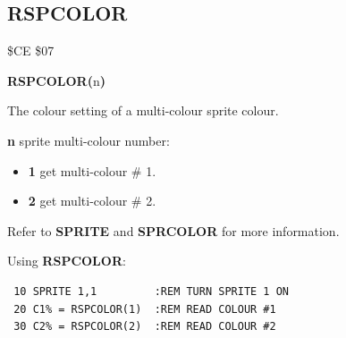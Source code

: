 \subsection{RSPCOLOR}
\begin{description}[leftmargin=2cm,style=nextline]
\item [Token:] \$CE \$07
\item [Format:] {\bf RSPCOLOR(}n{\bf)}
\item [Returns:]  The colour setting of a multi-colour sprite colour.

                {\bf n} sprite multi-colour number:

                \begin{itemize}
                    \item {\bf 1} get multi-colour \# 1.
                    \item {\bf 2} get multi-colour \# 2.
                \end{itemize}

\item [Remarks:] Refer to {\bf SPRITE} and {\bf SPRCOLOR} for more information.

\item [Example:] Using {\bf RSPCOLOR}:
\begin{tcolorbox}[colback=black,coltext=white]
\verbatimfont{\codefont}
\begin{verbatim}
 10 SPRITE 1,1         :REM TURN SPRITE 1 ON
 20 C1% = RSPCOLOR(1)  :REM READ COLOUR #1
 30 C2% = RSPCOLOR(2)  :REM READ COLOUR #2
\end{verbatim}
\end{tcolorbox}
\end{description}


\newpage
